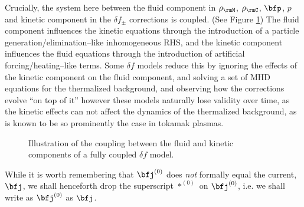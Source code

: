     \line

    Crucially, the system here between the fluid component in $\rho_{\rmM}$, $\rho_{\rmC}$, $\bfp$, $p$ and kinetic component in the $\delta\!f_{\pm}$ corrections is coupled. (See Figure \ref{fig:delta f coupling}) The fluid component influences the kinetic equations through the introduction of a particle generation/elimination--like inhomogeneous RHS, and the kinetic component influences the fluid equations through the introduction of artificial forcing/heating--like terms. Some $\delta\!f$ models reduce this by ignoring the effects of the kinetic component on the fluid component, and solving a set of MHD equations for the thermalized background, and observing how the corrections evolve ``on top of it''  however these models naturally lose validity over time, as the kinetic effects can not affect the dynamics of the thermalized background, as is known to be so prominently the case in tokamak plasmas.

    \begin{figure}[!ht]
        \centering
        \caption{Illustration of the coupling between the fluid and kinetic components of a fully coupled $\delta\!f$ model.}
        \label{fig:delta f coupling}
    \end{figure}
    
    While it is worth remembering that $\bfj^{(0)}$ does \emph{not} formally equal the current, $\bfj$, we shall henceforth drop the superscript $*^{(0)}$ on $\bfj^{(0)}$, i.e. we shall write as $\bfj^{(0)}$ as $\bfj$.
